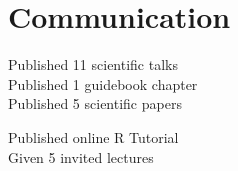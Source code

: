\documentclass[]{deedy-resume-openfont}
\begin{document}
\begin{minipage}[t]{0.33\textwidth}
\section{Communication}
\textbullet{} Published 11 scientific talks \\
\textbullet{} Published 1 guidebook chapter \\
\textbullet{} Published 5 scientific papers \\
\sectionsep

\textbullet{} Published online R Tutorial \\
\textbullet{} Given 5 invited lectures \\
\sectionsep 

%
%

\end{minipage} 
\hfill
\end{document}
